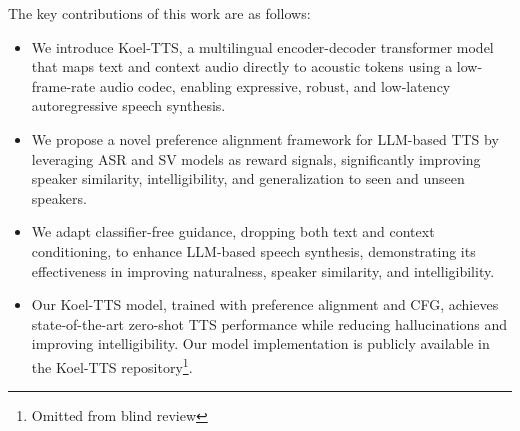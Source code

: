The key contributions of this work are as follows:
\begin{itemize}
\vspace{-0.3cm}
\item We introduce Koel-TTS, a multilingual encoder-decoder transformer model that maps text and context audio directly to acoustic tokens using a low-frame-rate audio codec, enabling expressive, robust, and low-latency autoregressive speech synthesis.
\vspace{-0.2cm}
\item We propose a novel preference alignment framework for LLM-based TTS by leveraging ASR and SV models as reward signals, significantly improving speaker similarity, intelligibility, and generalization to seen and unseen speakers.
\vspace{-0.2cm}
\item We adapt classifier-free guidance, dropping both text and context conditioning, to enhance LLM-based speech synthesis, demonstrating its effectiveness in improving naturalness, speaker similarity, and intelligibility.
\vspace{-0.2cm}
\item Our Koel-TTS model, trained with preference alignment and CFG, achieves state-of-the-art zero-shot TTS performance while reducing hallucinations and improving intelligibility. Our model implementation is publicly available in the Koel-TTS repository\footnote{Omitted from blind review}.
\vspace{-0.2cm}

\end{itemize}



